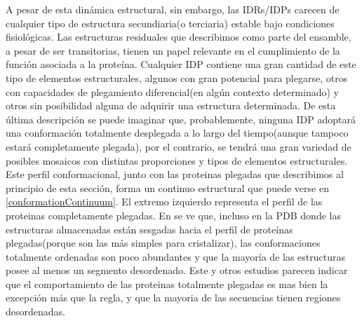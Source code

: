 A pesar de esta dinámica estructural, sin embargo, las IDRs/IDPs carecen de cualquier tipo de estructura secundiaria(o terciaria) estable bajo condiciones fisiológicas.
Las estructuras residuales que describimos como parte del ensamble, a pesar de ser transitorias, tienen un papel relevante en el cumplimiento de la función asociada a la proteína.
Cualquier IDP contiene una gran cantidad de este tipo de elementos estructurales, algunos con gran potencial para plegarse, otros con capacidades de plegamiento diferencial(en algún contexto determinado) y otros sin posibilidad alguna de adquirir una estructura determinada.
De esta última descripción se puede imaginar que, probablemente, ninguna IDP adoptará una conformación totalmente desplegada a lo largo del tiempo(aunque tampoco estará completamente plegada), por el contrario, se tendrá una gran variedad
de posibles mosaicos con distintas proporciones y tipos de elementos estructurales.
Este perfil conformacional, junto con las proteinas plegadas que describimos al principio de esta sección, forma un continuo estructural que puede verse en \ref{conformationContinuum}.
El extremo izquierdo representa el perfil de las proteinas completamente plegadas. 
En \cite{gall2007intrinsic} se ve que, incluso en la PDB donde las estructuras almacenadas están sesgadas hacia el perfil de proteínas plegadas(porque son las más simples para cristalizar), las conformaciones totalmente ordenadas son 
poco abundantes y que la mayoría de las estructuras posee al menos un segmento desordenado.
Este y otros estudios parecen indicar que el comportamiento de las proteinas totalmente plegadas es mas bien la excepción más que la regla, y que la mayoria de las secuencias tienen regiones desordenadas.



